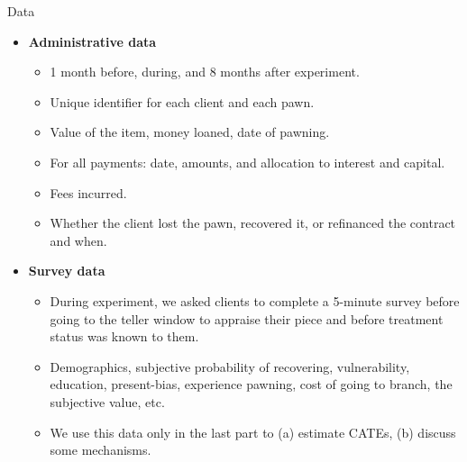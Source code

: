 \documentclass[9pt, aspectratio=169]{beamer}
\begin{document}
\begin{frame}{Data}
\begin{itemize}
    \item \textbf{Administrative data} 
    \begin{itemize}
        \item 1 month before, during, and 8 months after  experiment.
        \item Unique identifier for each client and each pawn.
        \item Value of the item, money loaned, date of pawning.
        \item For all payments: date,  amounts, and allocation to interest and capital.
        \item Fees incurred.
        \item Whether the client lost the pawn, recovered it, or refinanced the contract and when.
    \end{itemize} 

    \vfill \item \textbf{Survey data}
    \begin{itemize}
        \item During experiment, we asked clients to complete a 5-minute survey before going to the teller window to appraise their piece and before treatment status was known to them.
        \item Demographics, subjective probability of recovering, vulnerability, education, present-bias, experience pawning, cost of going to branch, the subjective value, etc.
        \item We use this data only in the last part to (a) estimate CATEs, (b) discuss some mechanisms.
    \end{itemize}
\end{itemize}    
\end{frame}
\end{document}
